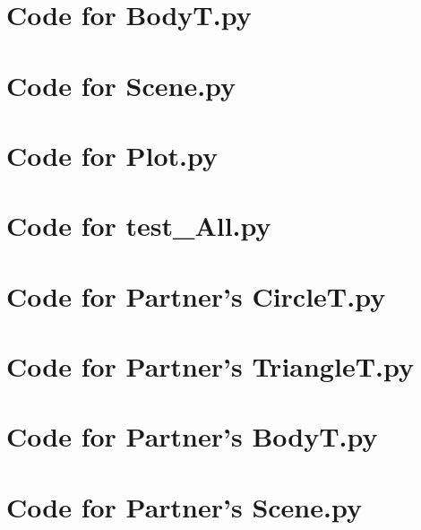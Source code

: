 \documentclass[12pt]{article}
\begin{document}
\noindent 

\newpage

\section{Code for BodyT.py}

\noindent 

\newpage

\section{Code for Scene.py}

\noindent 

\newpage

\section{Code for Plot.py}

\noindent 

\newpage

\section{Code for test\_All.py}

\noindent 

\newpage

\section{Code for Partner's CircleT.py}

\noindent 

\newpage

\section{Code for Partner's TriangleT.py}

\noindent 

\newpage

\section{Code for Partner's BodyT.py}

\noindent 

\newpage

\section{Code for Partner's Scene.py}

\noindent 

\newpage
\end{document}
